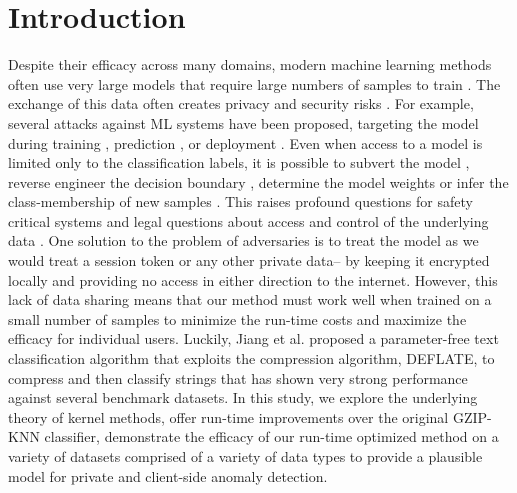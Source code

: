\documentclass[sigconf]{acmart}
\begin{document}

\maketitle

\section{Introduction}

Despite their efficacy across many domains, modern machine learning methods often use very large models that require large numbers of samples to train \cite{desislavov2021compute}. The exchange of this data often creates privacy and security risks \cite{}. For example, several attacks against ML systems have been proposed, targeting the model during training \cite{biggio_poisoning_2013}, prediction \cite{biggio_evasion_2013,deepfool,carlini_towards_2017}, or deployment \cite{distributed_attacks,santos2021universal}. Even when access to a model is limited only to the classification labels, it is possible to subvert the model \cite{hopskipjump}, reverse engineer the decision boundary \cite{deepfool}, determine the model weights \cite{jagielski2020high} or infer the class-membership of new samples \cite{bentley2020quantifying}. This raises profound questions for safety critical systems \cite{meyers} and legal questions about access and control of the underlying data \cite{mitrou2018data,marks2023ai}. One solution to the problem of adversaries is to treat the model as we would treat a session token or any other private data-- by keeping it encrypted locally and providing no access in either direction to the internet. However, this lack of data sharing means that our method must work well when trained on a small number of samples to minimize the run-time costs and maximize the efficacy for individual users.  Luckily, Jiang et al.\cite{jiang2022less} proposed a parameter-free text classification algorithm that exploits the compression algorithm, DEFLATE, to compress and then classify strings that has shown very strong performance against several benchmark datasets. In this study, we explore the underlying theory of kernel methods, offer run-time improvements over the original\cite{jiang2022less} GZIP-KNN classifier, demonstrate the efficacy of our run-time optimized method on a variety of datasets comprised of a variety of data types to provide a plausible model for private and client-side anomaly detection.
\end{document}
